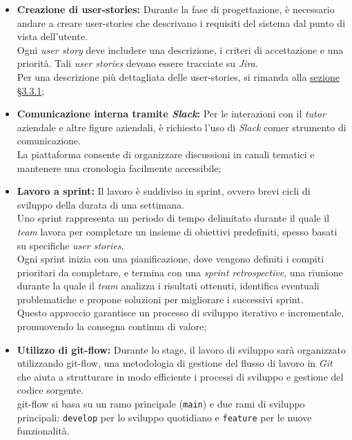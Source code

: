 \begin{itemize}
    \item \textbf{Creazione di \gls{user-stories}:} Durante la fase di progettazione, è necessario andare a creare \gls{user-stories} che descrivano i requisiti del sistema dal punto di vista dell’utente.\\
    Ogni \textit{user story} deve includere una descrizione, i criteri di accettazione e una priorità.
    Tali \textit{user stories} devono essere tracciate su \textit{Jira}.\\
    Per una descrizione più dettagliata delle \gls{user-stories}, si rimanda alla \hyperref[subsec:user-story-mapping]{sezione §3.3.1};
    \item \textbf{Comunicazione interna tramite \textit{Slack}:} Per le interazioni con il \textit{tutor} aziendale e altre figure aziendali, è richiesto l’uso di \textit{Slack} comer strumento di comunicazione.\\
    La piattaforma consente di organizzare discussioni in canali tematici e mantenere una cronologia facilmente accessibile;
    \item \textbf{Lavoro a \gls{sprint}:} Il lavoro è suddiviso in \gls{sprint}, ovvero brevi cicli di sviluppo della durata di una settimana.\\
    Uno \gls{sprint} rappresenta un periodo di tempo delimitato durante il quale il \textit{team} lavora per completare un insieme di obiettivi predefiniti, spesso basati su specifiche \textit{user stories}. \\
    Ogni \gls{sprint} inizia con una pianificazione, dove vengono definiti i compiti prioritari da completare, e termina con una \textit{sprint retrospective}, 
    una riunione durante la quale il \textit{team} analizza i risultati ottenuti, identifica eventuali problematiche e propone soluzioni per migliorare i successivi \gls{sprint}. \\
    Questo approccio garantisce un processo di sviluppo iterativo e incrementale, promuovendo la consegna continua di valore;
    \item \textbf{Utilizzo di \gls{git-flow}:} Durante lo stage, il lavoro di sviluppo sarà organizzato utilizzando \gls{git-flow}, una metodologia di gestione del flusso di lavoro in \textit{Git} che aiuta a strutturare in modo efficiente i processi di sviluppo e gestione del codice sorgente.\\
    \gls{git-flow} si basa su un ramo principale (\texttt{main}) e due rami di sviluppo principali: \texttt{develop} per lo sviluppo quotidiano e \texttt{feature} per le nuove funzionalità.\\

\end{itemize}
